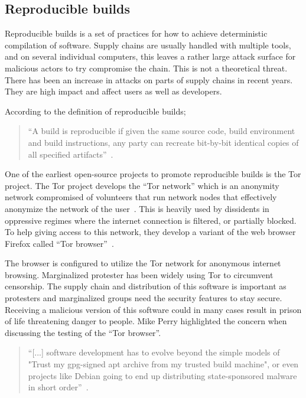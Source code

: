 \documentclass[../Main/thesis.tex]{subfiles}
\begin{document}
\subsection*{Reproducible builds}
Reproducible builds is a set of practices for how to achieve deterministic
compilation of software. Supply chains are usually handled with multiple tools,
and on several individual computers, this leaves a rather large attack surface
for malicious actors to try compromise the chain. This is not a theoretical
threat. There has been an increase in attacks on parts of supply chains in
recent years. They are high impact and affect users as well as developers.

According to the definition of reproducible builds;

\begin{quotation}
``A build is reproducible if given the same source code, build environment
and build instructions, any party can recreate bit-by-bit identical copies of
all specified artifacts''~\cite{reproducible-builds-2019-definitions}.
\end{quotation}

One of the earliest open-source projects to promote reproducible builds is the
Tor project. The Tor project develops the ``Tor network'' which is an anonymity
network compromised of volunteers that run network nodes that effectively
anonymize the network of the user~\cite{tor}. This is heavily used by dissidents
in oppressive regimes where the internet connection is filtered, or partially
blocked. To help giving access to this network, they develop a variant of the
web browser Firefox called ``Tor browser''~\cite{tor-browser}.

The browser is configured to utilize the Tor network for anonymous internet
browsing. Marginalized protester has been widely using Tor to circumvent
censorship. The supply chain and distribution of this software is important as
protesters and marginalized groups need the security features to stay secure.
Receiving a malicious version of this software could in many cases result in
prison of life threatening danger to people. Mike Perry highlighted the concern
when discussing the testing of the ``Tor browser''.

\begin{quotation}
    ``[...] software development has to evolve beyond the simple models of
"Trust my gpg-signed apt archive from my trusted build machine", or even
projects like Debian going to end up distributing state-sponsored malware in
short order''~\cite{mike-perry-2013}.
\end{quotation}
\end{document}
